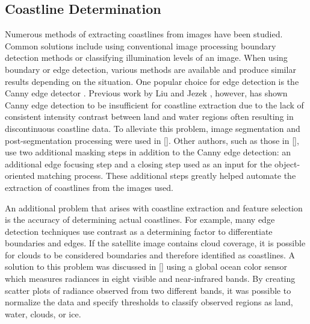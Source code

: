 \documentclass[]{aiaa-tc}%
\begin{document}
\subsection{Coastline Determination}
Numerous methods of extracting coastlines from images have been studied.  Common solutions include using conventional image processing boundary detection methods or classifying illumination levels of an image.  When using boundary or edge detection, various methods are available and produce similar results depending on the situation.  One popular choice for edge detection is the Canny edge detector \cite{Canny:1986}.  Previous work by Liu and Jezek \cite{Liu:2004}, however, has shown Canny edge detection to be insufficient for coastline extraction due to the lack of consistent intensity contrast between land and water regions often resulting in discontinuous coastline data.  To alleviate this problem, image segmentation and post-segmentation processing were used in [].  Other authors, such as those in [], use two additional masking steps in addition to the Canny edge detection: an additional edge focusing step and a closing step used as an input for the object-oriented matching process.  These additional steps greatly helped automate the extraction of coastlines from the images used.

An additional problem that arises with coastline extraction and feature selection is the accuracy of determining actual coastlines.  For example, many edge detection techniques use contrast as a determining factor to differentiate boundaries and edges.  If the satellite image contains cloud coverage, it is possible for clouds to be considered boundaries and therefore identified as coastlines.  A solution to this problem was discussed in [] using a global ocean color sensor which measures radiances in eight visible and near-infrared bands.  By creating scatter plots of radiance observed from two different bands, it was possible to normalize the data and specify thresholds to classify observed regions as land, water, clouds, or ice.  

\end{document}
